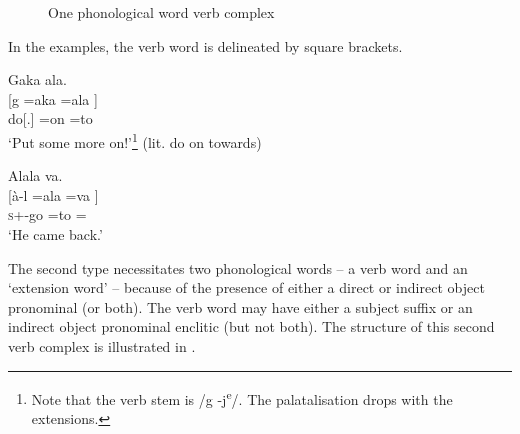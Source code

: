 \begin{figure}
\caption{\label{fig:7.1}One phonological word verb complex}
\end{figure}
In the examples, the verb word is delineated by square brackets.

\ea\label{ex:7:1}
Gaka  ala.\\
\gll {}[g     =aka   =ala ]\\
do[{\twoS}.{\IMP}]    =on   =to\\
\glt ‘Put some more on!’\footnote{Note that the verb stem is /g -j\textsuperscript{e}/.  The palatalisation drops with the extensions.} (lit. do on towards)  
\z

\ea\label{ex:7:2}
Alala  va.\\
\gll  {}[à-l  =ala  =va ]\\
\textsc{s}+{\PFV}-go  =to  ={\PRF}\\
\glt  ‘He came back.’ 
\z

The second type necessitates two phonological words -- a verb word and an ‘extension word’ – because of the presence of either a direct or indirect object pronominal (or both). The verb word may have either a subject suffix or an indirect object pronominal enclitic (but not both). The structure of this second verb complex is illustrated in .

